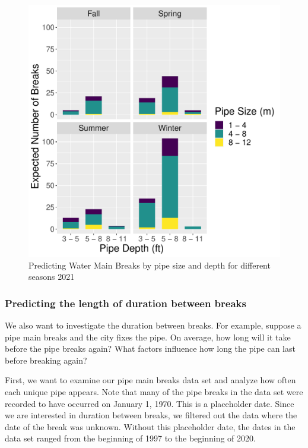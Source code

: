 \documentclass[twocolumn]{article}
\begin{document}
\begin{figure}[h!]
    \centering
    \includegraphics[scale = 0.45]{Gautam/pipemodel.pdf}
    \caption{Predicting Water Main Breaks by pipe size and depth for different seasons 2021}
    \label{fig:Polynomial Regression Total Computation}
\end{figure}



\subsubsection{Predicting the length of duration between breaks}

We also want to investigate the duration between breaks. For example, suppose a pipe main breaks and the city fixes the pipe. On average, how long will it take before the pipe breaks again? What factors influence how long the pipe can last before breaking again? 

First, we want to examine our pipe main breaks data set and analyze how often each unique pipe appears. Note that many of the pipe breaks in the data set were recorded to have occurred on January 1, 1970. This is a placeholder date. Since we are interested in duration between breaks, we filtered out the data where the date of the break was unknown. Without this placeholder date, the dates in the data set ranged from the beginning of 1997 to the beginning of 2020. 
\end{document}
